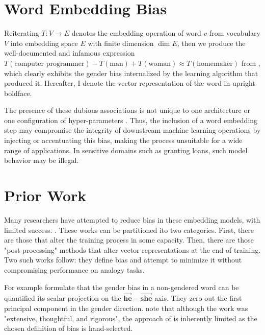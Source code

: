 \documentclass[11pt,a4paper]{article}
\begin{document}
\section{Word Embedding Bias}

Reiterating $T : V \to E$ denotes the embedding operation of word $v$ from
vocabulary $V$ into embedding space $E$ with finite dimension $\dim E$, then we
produce the well-documented and infamous expression $ T(\text{computer
    programmer}) - T(\mathrm{man}) + T(\mathrm{woman})  \approx
  T(\mathrm{homemaker})$ from \cite{biased_analogy-1607-06520}, which clearly
exhibits the gender bias internalized by the learning algorithm that produced
it. Hereafter, I denote the vector representation of the word in upright
boldface.

The presence of these dubious associations is not unique to one architecture or
one configuration of hyper-parameters \cite{origins-1810-03611}. Thus, the
inclusion of a word embedding step may compromise the integrity of downstream
machine learning operations by injecting or accentuating this bias, making the
process unsuitable for a wide range of applications. In sensitive domains such
as granting loans, such model behavior may be illegal.

\section{Prior Work}

Many researchers have attempted to reduce bias in these embedding models, with
limited success. \citet{caliskan2017semantics}. These works can be partitioned
ito two categories. First, there are those that alter the training process in
some capacity. Then, there are those "post-processing" methods that alter vector
representations at the end of training. Two such works follow: they define bias
and attempt to minimize it without compromising performance on analogy tasks.

For example \citet{biased_analogy-1607-06520} formulate that the gender bias in a
non-gendered word can be quantified its scalar projection on the $\Vec{\textbf{he}} -
  \Vec{\textbf{she}}$ axis. They zero out the first principal component in the
gender direction.  \citet{lipstick-1903-03862} note that although the work was
"extensive, thoughtful, and rigorous", the approach of \citet{biased_analogy-1607-06520}
is inherently limited as the chosen definition of bias is hand-selected.
\end{document}
